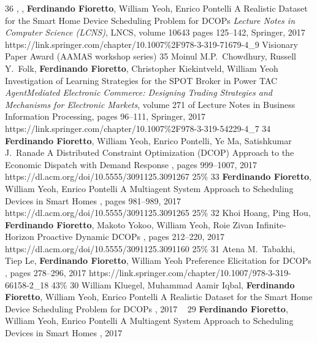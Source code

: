 \begin{pubs}

\journalentryAwd
	{36} %
	{, , {\bf Ferdinando Fioretto}, William Yeoh, Enrico Pontelli}
	{A Realistic Dataset for the Smart Home Device Scheduling Problem for DCOPs}
	{\emph{Lecture Notes in Computer Science (LCNS)}, LNCS, volume 10643 pages 125--142, Springer, 2017}
	{https://link.springer.com/chapter/10.1007\%2F978-3-319-71679-4\_9}
	{Visionary Paper Award}
	{(AAMAS workshop series)}
\journalentry
	{35} %
	{Moinul M.P.~Chowdhury, Russell Y.~Folk, {\bf Ferdinando Fioretto}, Christopher Kiekintveld, William Yeoh}
	{Investigation of Learning Strategies for the SPOT Broker in Power TAC}
	{\emph{AgentMediated Electronic Commerce: Designing Trading Strategies and Mechanisms for Electronic Markets}, volume 271 of Lecture Notes in Business Information Processing, 
	    pages 96–111, Springer, 2017}
    {https://link.springer.com/chapter/10.1007\%2F978-3-319-54229-4\_7}
\confentry 
	{34} %
	{{\bf Ferdinando Fioretto}, William Yeoh, Enrico Pontelli, Ye Ma, Satishkumar J.~Ranade}
	{A Distributed Constraint Optimization (DCOP) Approach to the Economic Dispatch with Demand Response}
	{\procAAMAS, pages  999--1007, 2017}
	{https://dl.acm.org/doi/10.5555/3091125.3091267}
	{25\%}%
\confentry 
	{33} %
	{{\bf Ferdinando Fioretto},  William Yeoh, Enrico Pontelli}
	{A Multiagent System Approach to Scheduling Devices in Smart Homes}
	{\procAAMAS, pages 981--989, 2017} 
	{https://dl.acm.org/doi/10.5555/3091125.3091265}
	{25\%}%
\confentry
	{32} %
	{Khoi Hoang, Ping Hou, {\bf Ferdinando Fioretto}, Makoto Yokoo, William Yeoh, Roie Zivan}
	{Infinite-Horizon Proactive Dynamic DCOPs}
	{\procAAMAS, pages 212--220, 2017}
	{https://dl.acm.org/doi/10.5555/3091125.3091160}
	{25\%}%
\confentry 
	{31} %
	{Atena M.~Tabakhi, Tiep Le, {\bf Ferdinando Fioretto}, William Yeoh}
	{Preference Elicitation for DCOPs}
	{\procCP, pages 278--296, 2017}
	{https://link.springer.com/chapter/10.1007/978-3-319-66158-2\_18}
	{43\%}%
\wsentry
	{30} %
	{William Kluegel, Muhammad Aamir Iqbal, {\bf Ferdinando Fioretto}, William Yeoh, Enrico Pontelli}
	{A Realistic Dataset for the Smart Home Device Scheduling Problem for DCOPs}
	{, 
	2017}
	{~}	
\wsentry
	{29} %
	{{\bf Ferdinando Fioretto},  William Yeoh, Enrico Pontelli}
	{A Multiagent System Approach to Scheduling Devices in Smart Homes}
	{, 2017}
	{~}


\end{pubs}
